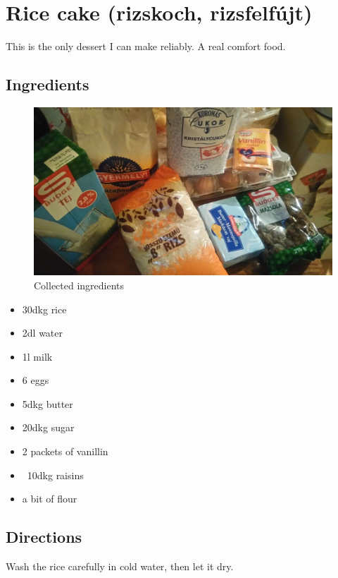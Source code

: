 \documentclass{article}
\begin{document}
\newpage
\section{Rice cake (rizskoch, rizsfelfújt)}

This is the only dessert I can make reliably. A real comfort food.

\subsection{Ingredients}

\begin{figure}[!htbp]
\includegraphics[width=\textwidth]{rizskoch_01}
\caption{Collected ingredients}
\end{figure}

\begin{itemize}
    \item 30dkg rice
    \item 2dl water
    \item 1l milk
    \item 6 eggs
    \item 5dkg butter
    \item 20dkg sugar
    \item 2 packets of vanillin
    \item ~10dkg raisins
    \item a bit of flour
\end{itemize}

\subsection{Directions}

Wash the rice carefully in cold water, then let it dry.
\end{document}
